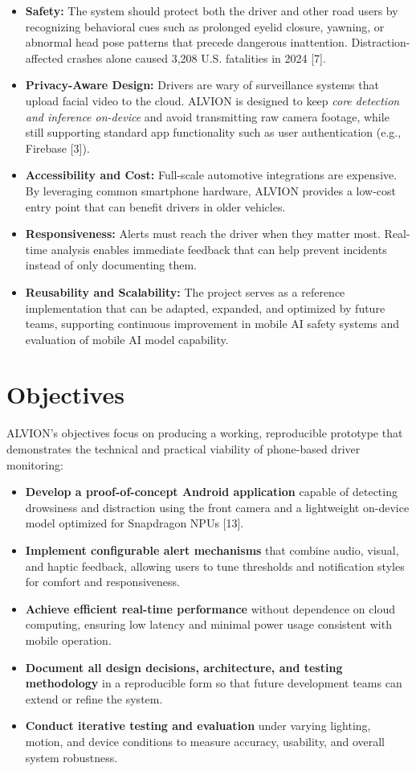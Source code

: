 \documentclass[11pt]{report}
\begin{document}
\begin{itemize}
    \item \textbf{Safety:} The system should protect both the driver and other road users by recognizing behavioral cues such as prolonged eyelid closure, yawning, or abnormal head pose patterns that precede dangerous inattention. Distraction-affected crashes alone caused 3{,}208 U.S. fatalities in 2024 [7].
    \item \textbf{Privacy-Aware Design:} Drivers are wary of surveillance systems that upload facial video to the cloud. ALVION is designed to keep \emph{core detection and inference on-device} and avoid transmitting raw camera footage, while still supporting standard app functionality such as user authentication (e.g., Firebase [3]).
    \item \textbf{Accessibility and Cost:} Full-scale automotive integrations are expensive. By leveraging common smartphone hardware, ALVION provides a low-cost entry point that can benefit drivers in older vehicles.
    \item \textbf{Responsiveness:} Alerts must reach the driver when they matter most. Real-time analysis enables immediate feedback that can help prevent incidents instead of only documenting them.
    \item \textbf{Reusability and Scalability:} The project serves as a reference implementation that can be adapted, expanded, and optimized by future teams, supporting continuous improvement in mobile AI safety systems and evaluation of mobile AI model capability.
\end{itemize}
\clearpage

\section{Objectives}
ALVION’s objectives focus on producing a working, reproducible prototype that demonstrates the technical and practical viability of phone-based driver monitoring:

\begin{itemize}
  \item \textbf{Develop a proof-of-concept Android application} capable of detecting drowsiness and distraction using the front camera and a lightweight on-device model optimized for Snapdragon NPUs [13].
  \item \textbf{Implement configurable alert mechanisms} that combine audio, visual, and haptic feedback, allowing users to tune thresholds and notification styles for comfort and responsiveness.
  \item \textbf{Achieve efficient real-time performance} without dependence on cloud computing, ensuring low latency and minimal power usage consistent with mobile operation.
  \item \textbf{Document all design decisions, architecture, and testing methodology} in a reproducible form so that future development teams can extend or refine the system.
  \item \textbf{Conduct iterative testing and evaluation} under varying lighting, motion, and device conditions to measure accuracy, usability, and overall system robustness.
\end{itemize}
\end{document}
